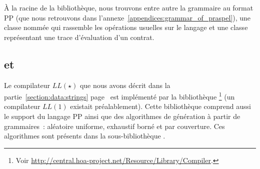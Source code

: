 À la racine de la bibliothèque, nous trouvons entre autre la grammaire au format
PP (que nous retrouvons dans l'annexe~\ref{appendices:grammar_of_praspel}), une
classe nommée  qui rassemble les opérations usuelles
sur le langage et une classe représentant une trace d'évaluation d'un contrat.

\subsection{ et }
\label{subsection:tools:hoa-compiler-regex}

Le compilateur $LL(\star)$ que nous avons décrit dans la
partie~\ref{section:data:strings} page~\pageref{section:data:strings} est
implémenté par la bibliothèque
\footnote{Voir
\url{http://central.hoa-project.net/Resource/Library/Compiler}.} (un compilateur
$LL(1)$ existait préalablement). Cette bibliothèque comprend aussi le support du
langage PP ainsi que des algorithmes de génération à partir de grammaires~:
aléatoire uniforme, exhaustif borné et par couverture. Ces algorithmes sont
présents dans la sous-bibliothèque
.

